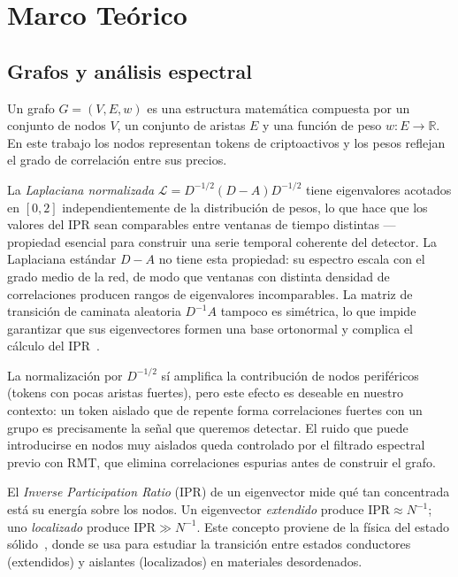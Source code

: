 \section{Marco Teórico}
\label{sec:marco}

\subsection{Grafos y análisis espectral}

Un grafo $G = (V, E, w)$ es una estructura matemática compuesta por un
conjunto de nodos $V$, un conjunto de aristas $E$ y una función de peso
$w : E \to \mathbb{R}$. En este trabajo los nodos representan tokens de
criptoactivos y los pesos reflejan el grado de correlación entre sus precios.

La \emph{Laplaciana normalizada} $\mathcal{L} = D^{-1/2}(D-A)D^{-1/2}$
tiene eigenvalores acotados en $[0,2]$ independientemente de la
distribución de pesos, lo que hace que los valores del IPR sean
comparables entre ventanas de tiempo distintas --- propiedad esencial
para construir una serie temporal coherente del detector. La Laplaciana
estándar $D - A$ no tiene esta propiedad: su espectro escala con el
grado medio de la red, de modo que ventanas con distinta densidad de
correlaciones producen rangos de eigenvalores incomparables. La
matriz de transición de caminata aleatoria $D^{-1}A$ tampoco es simétrica,
lo que impide garantizar que sus eigenvectores formen una base ortonormal y
complica el cálculo del IPR~\cite{newman2003}.

La normalización por $D^{-1/2}$ sí amplifica la contribución de nodos
periféricos (tokens con pocas aristas fuertes), pero este efecto es
deseable en nuestro contexto: un token aislado que de repente forma
correlaciones fuertes con un grupo es precisamente la señal que queremos
detectar. El ruido que puede introducirse en nodos muy aislados queda
controlado por el filtrado espectral previo con RMT, que elimina
correlaciones espurias antes de construir el grafo.

El \emph{Inverse Participation Ratio} (IPR) de un eigenvector mide qué
tan concentrada está su energía sobre los nodos. Un eigenvector
\emph{extendido} produce $\mathrm{IPR} \approx N^{-1}$; uno
\emph{localizado} produce $\mathrm{IPR} \gg N^{-1}$. Este concepto
proviene de la física del estado sólido~\cite{anderson1958absence}, donde
se usa para estudiar la transición entre estados conductores (extendidos)
y aislantes (localizados) en materiales desordenados.

